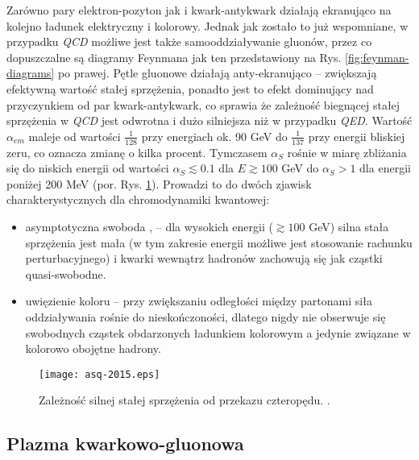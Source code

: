 Zarówno pary elektron-pozyton jak i kwark-antykwark działają ekranująco na kolejno ładunek elektryczny i kolorowy. Jednak jak zostało to już wspomniane, w przypadku \textit{QCD} możliwe jest także samooddziaływanie gluonów, przez co dopuszczalne są diagramy Feynmana jak ten przedstawiony na Rys. \ref{fig:feynman-diagrams} po prawej. Pętle gluonowe działają anty-ekranująco -- zwiększają efektywną wartość stałej sprzężenia, ponadto jest to efekt dominujący nad przyczynkiem od par kwark-antykwark, co sprawia że zależność biegnącej stałej sprzężenia w \textit{QCD} jest odwrotna i dużo silniejsza niż w przypadku \textit{QED}. Wartość $\alpha_{em}$ maleje od wartości $\frac{1}{128}$ przy energiach ok. 90 GeV do $\frac{1}{137}$ przy energii bliskiej zeru, co oznacza zmianę o kilka procent. 
Tymczasem $\alpha_S$ rośnie w miarę zbliżania się do niskich energii od wartości $\alpha_S\lesssim 0.1$ dla $E \gtrsim 100$ GeV do $\alpha_S > 1$ dla energii poniżej 200 MeV (por. Rys. \ref{fig:running-coupling-const}). Prowadzi to do dwóch zjawisk charakterystycznych dla chromodynamiki kwantowej: 
\begin{itemize}
	\item asymptotyczna swoboda  \cite{Gross:1973id}, \cite{Politzer:1973fx} -- dla wysokich energii ($\gtrsim 100$ GeV) silna stała sprzężenia jest mała (w tym zakresie energii możliwe jest stosowanie rachunku perturbacyjnego) i kwarki wewnątrz hadronów zachowują się jak cząstki quasi-swobodne.
	\item uwięzienie koloru  -- przy zwiększaniu odległości między partonami siła oddziaływania rośnie do nieskończoności, dlatego nigdy nie obserwuje się swobodnych cząstek obdarzonych ładunkiem kolorowym a jedynie związane w kolorowo obojętne hadrony.
\end{itemize}


\begin{figure}[h]
	\centering
	\texttt{[image: asq-2015.eps]}
	\caption{Zależność silnej stałej sprzężenia od przekazu czteropędu. .}
	\label{fig:running-coupling-const}
\end{figure}


\subsection{Plazma kwarkowo-gluonowa}
\label{subsec:qgp}

